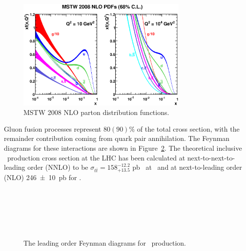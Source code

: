 \begin{figure}[htbp]
  \centering
    \includegraphics[width=0.75\textwidth]{PartTopQuark/Plots/mstw2008nlo68cl_allpdfs.eps}
    \caption{MSTW 2008 NLO parton distribution functions.}
  \label{fig:TopMSTWNLOPDFs}
\end{figure}

Gluon fusion processes represent $\num{80}(\num{90})\si{\percent}$ of the total cross section, with the remainder contribution coming from quark pair annihilation. The Feynman diagrams for these interactions are shown in Figure~\ref{fig:TopQuarkProduction}. The theoretical inclusive \ttbar\ production cross section at the LHC has been calculated at next-to-next-to-leading order (NNLO) to be $\sigma_{t\bar{t}}=158^{-12.2}_{+13.5}$ \si{\pico\barn}~\cite{TopPair} at \cmsS\ and at next-to-leading order (NLO) \SI{246(10)}{\pico\barn} for \cmsE.
%
~
\begin{figure}[htbp]
  \centering
  \begin{minipage}[][][t]{.47\textwidth}
    \centering
    
  \end{minipage}
  \,
  \begin{minipage}[][][t]{.47\textwidth}
    \centering
    
  \end{minipage}
  
  \begin{minipage}[][][t]{.47\textwidth}
    \centering
    
  \end{minipage}
  \,
  \begin{minipage}[][][t]{.47\textwidth}
    \centering
    
  \end{minipage}
  \,
  \caption{The leading order Feynman diagrams for \ttbar\ production.}
  \label{fig:TopQuarkProduction}
\end{figure}

